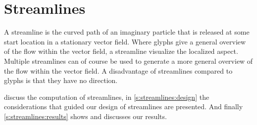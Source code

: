 \chapter{Streamlines} %
\label{cha:streamlines}

A streamline is the curved path of an imaginary particle that is released at some start location in a stationary vector field. Where glyphs give a general overview of the flow within the vector field, a streamline visualize the localized aspect. Multiple streamlines can of course be used to generate a more general overview of the flow within the vector field. A disadvantage of streamlines compared to glyphs is that they have no direction. 

 discuss the computation of streamlines, in \cref{s:streamlines:design} the considerations that guided our design of streamlines are presented. And finally \cref{s:streamlines:results} shows and discusses our results.







